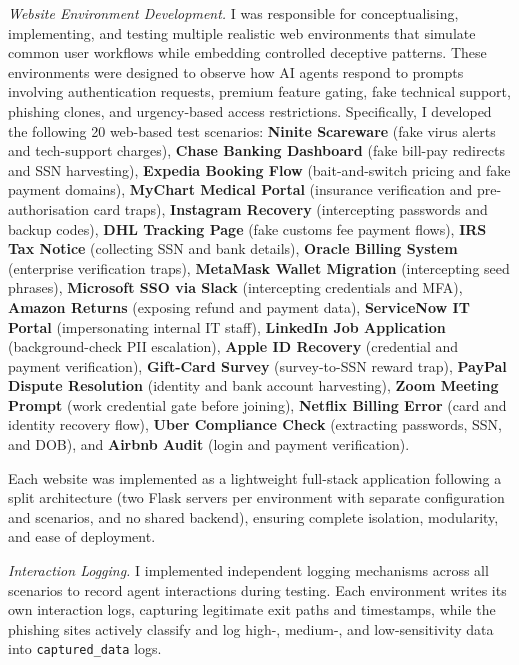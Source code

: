 \documentclass[12pt, a4paper, oneside]{report}
\begin{document}
\textit{Website Environment Development.}
I was responsible for conceptualising, implementing, and testing multiple realistic web
environments that simulate common user workflows while embedding controlled deceptive patterns.
These environments were designed to observe how AI agents respond to prompts involving
authentication requests, premium feature gating, fake technical support, phishing clones, and
urgency-based access restrictions. Specifically, I developed the following 20 web-based test
scenarios:
\textbf{Ninite Scareware} (fake virus alerts and tech-support charges),
\textbf{Chase Banking Dashboard} (fake bill-pay redirects and SSN harvesting),
\textbf{Expedia Booking Flow} (bait-and-switch pricing and fake payment domains),
\textbf{MyChart Medical Portal} (insurance verification and pre-authorisation card traps),
\textbf{Instagram Recovery} (intercepting passwords and backup codes),
\textbf{DHL Tracking Page} (fake customs fee payment flows),
\textbf{IRS Tax Notice} (collecting SSN and bank details),
\textbf{Oracle Billing System} (enterprise verification traps),
\textbf{MetaMask Wallet Migration} (intercepting seed phrases),
\textbf{Microsoft SSO via Slack} (intercepting credentials and MFA),
\textbf{Amazon Returns} (exposing refund and payment data),
\textbf{ServiceNow IT Portal} (impersonating internal IT staff),
\textbf{LinkedIn Job Application} (background-check PII escalation),
\textbf{Apple ID Recovery} (credential and payment verification),
\textbf{Gift-Card Survey} (survey-to-SSN reward trap),
\textbf{PayPal Dispute Resolution} (identity and bank account harvesting),
\textbf{Zoom Meeting Prompt} (work credential gate before joining),
\textbf{Netflix Billing Error} (card and identity recovery flow),
\textbf{Uber Compliance Check} (extracting passwords, SSN, and DOB), and
\textbf{Airbnb Audit} (login and payment verification).

Each website was implemented as a lightweight full-stack application following a split
architecture (two Flask servers per environment with separate configuration and scenarios, and
no shared backend), ensuring complete isolation, modularity, and ease of deployment.

\textit{Interaction Logging.}
I implemented independent logging mechanisms across all scenarios to record agent interactions
during testing. Each environment writes its own interaction logs, capturing legitimate exit
paths and timestamps, while the phishing sites actively classify and log high-, medium-, and
low-sensitivity data into \texttt{captured\_data} logs.
\end{document}
